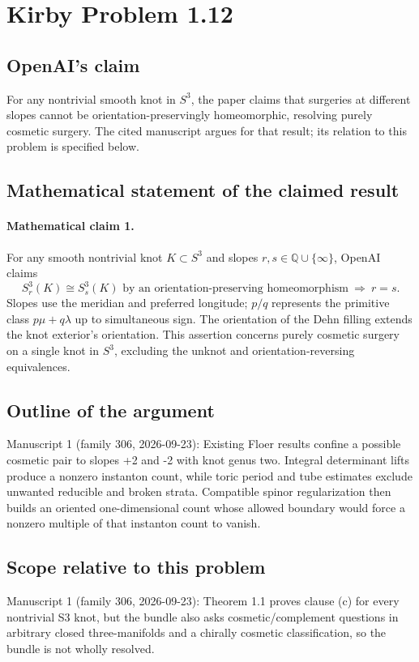 \documentclass[11pt]{article}
\begin{document}
\section*{Kirby Problem 1.12}

\subsection{OpenAI's claim}
For any nontrivial smooth knot in \(S^3\), the paper claims that surgeries at different slopes cannot be orientation-preservingly homeomorphic, resolving purely cosmetic surgery. The cited manuscript argues for that result; its relation to this problem is specified below.

\subsection{Mathematical statement of the claimed result}
\paragraph{Mathematical claim 1.} For any smooth nontrivial knot $K\subset S^3$ and slopes $r,s\in\mathbb Q\cup\{\infty\}$, OpenAI claims
\[
S^3_r(K)\cong S^3_s(K)\text{ by an orientation-preserving homeomorphism}\ \Longrightarrow\ r=s.
\]
Slopes use the meridian and preferred longitude; $p/q$ represents the primitive class $p\mu+q\lambda$ up to simultaneous sign. The orientation of the Dehn filling extends the knot exterior's orientation. This assertion concerns purely cosmetic surgery on a single knot in $S^3$, excluding the unknot and orientation-reversing equivalences.

\subsection{Outline of the argument}
Manuscript 1 (family 306, 2026-09-23): Existing Floer results confine a possible cosmetic pair to slopes +2 and -2 with knot genus two. Integral determinant lifts produce a nonzero instanton count, while toric period and tube estimates exclude unwanted reducible and broken strata. Compatible spinor regularization then builds an oriented one-dimensional count whose allowed boundary would force a nonzero multiple of that instanton count to vanish.

\subsection{Scope relative to this problem}
Manuscript 1 (family 306, 2026-09-23): Theorem 1.1 proves clause (c) for every nontrivial S3 knot, but the bundle also asks cosmetic/complement questions in arbitrary closed three-manifolds and a chirally cosmetic classification, so the bundle is not wholly resolved.
\end{document}
